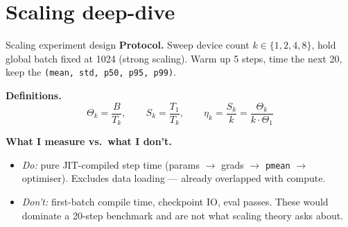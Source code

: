 \documentclass[aspectratio=169,10pt]{beamer}
\begin{document}
\section{Scaling deep-dive}

\begin{frame}{Scaling experiment design}
  \textbf{Protocol.} Sweep device count $k \in \{1, 2, 4, 8\}$, hold global batch
  fixed at 1024 (strong scaling). Warm up 5 steps, time the next 20, keep the
  \texttt{(mean, std, p50, p95, p99)}.

  \vspace{0.4em}
  \textbf{Definitions.}
  \[
    \Theta_k = \frac{B}{T_k}, \qquad
    S_k = \frac{T_1}{T_k}, \qquad
    \eta_k = \frac{S_k}{k} = \frac{\Theta_k}{k\cdot\Theta_1}
  \]

  \vspace{0.3em}
  \textbf{What I measure vs.\ what I don't.}
  \begin{itemize}\small
    \item \emph{Do:} pure JIT-compiled step time (params $\to$ grads $\to$ \texttt{pmean}
          $\to$ optimiser). Excludes data loading — already overlapped with compute.
    \item \emph{Don't:} first-batch compile time, checkpoint IO, eval passes. These would
          dominate a 20-step benchmark and are not what scaling theory asks about.
  \end{itemize}
\end{frame}
\end{document}
